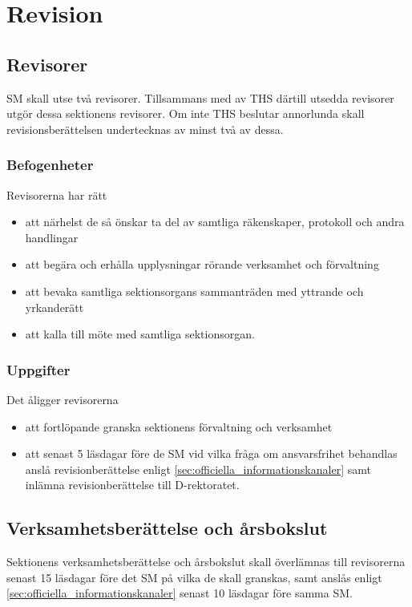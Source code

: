 \documentclass{dgovdoc}
\begin{document}
\section{Revision}

\subsection{Revisorer}
\label{sec:revisorer}

SM skall utse två revisorer. Tillsammans med av THS därtill utsedda revisorer
utgör dessa sektionens revisorer. Om inte THS beslutar annorlunda skall
revisionsberättelsen undertecknas av minst två av dessa.

\subsubsection{Befogenheter}

Revisorerna har rätt

\begin{itemize}
  \item att närhelst de så önskar ta del av samtliga räkenskaper, protokoll och
    andra handlingar
  \item att begära och erhålla upplysningar rörande verksamhet och förvaltning
  \item att bevaka samtliga sektionsorgans sammanträden med yttrande och
    yrkanderätt
  \item att kalla till möte med samtliga sektionsorgan.
\end{itemize}

\subsubsection{Uppgifter}

Det åligger revisorerna

\begin{itemize}
  \item att fortlöpande granska sektionens förvaltning och verksamhet
  \item att senast 5 läsdagar före de SM vid vilka fråga om ansvarsfrihet
    behandlas anslå revisionberättelse enligt
    \ref{sec:officiella_informationskanaler} samt inlämna revisionberättelse
    till D-rektoratet.
\end{itemize}

\subsection{Verksamhetsberättelse och årsbokslut}

Sektionens verksamhetsberättelse och årsbokslut skall överlämnas till
revisorerna senast 15 läsdagar före det SM på vilka de skall granskas, samt
anslås enligt \ref{sec:officiella_informationskanaler} senast 10 läsdagar före
samma SM.
\end{document}
